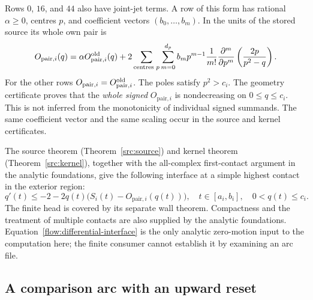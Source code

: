 \documentclass[11pt,a4paper]{article}
\theoremstyle{definition}
\theoremstyle{remark}
\begin{document}
Rows $0$, $16$, and $44$ also have joint-jet terms.  A row of this form
has rational $\alpha\geq0$, centres $p$, and coefficient vectors
$(b_0,\ldots,b_m)$.  In the units of the stored source its whole own pair is
\begin{equation}
 O_{\mathrm{pair},i}(q)=\alpha O_{\mathrm{pair},i}^{\rm old}(q)+
 2\sum_{\text{centres }p}\sum_{m=0}^{d_p}
 b_m p^{m-1}\frac{1}{m!}
 \frac{\partial^m}{\partial p^m}\left(\frac{2p}{p^2-q}\right).
 \label{flow:jet-own}
\end{equation}
For the other rows $O_{\mathrm{pair},i}=O_{\mathrm{pair},i}^{\rm old}$.  The poles satisfy $p^2>c_i$.
The geometry certificate proves that the \emph{whole signed} $O_{\mathrm{pair},i}$ is
nondecreasing on $0\leq q\leq c_i$.  This is not inferred from the
monotonicity of individual signed summands.  The same coefficient vector
and the same scaling occur in the source and kernel certificates.

The source theorem (Theorem~\ref{src:source}) and kernel theorem
(Theorem~\ref{src:kernel}), together
with the all-complex first-contact argument in the analytic foundations,
give the following interface at a simple highest contact in the exterior
region:
\begin{equation}
 q'(t)\leq-2-2q(t)\bigl(S_i(t)-O_{\mathrm{pair},i}(q(t))\bigr),
 \quad t\in[a_i,b_i],\quad 0<q(t)\leq c_i.
 \label{flow:differential-interface}
\end{equation}
The finite head is covered by its separate wall theorem.  Compactness
and the treatment of multiple contacts are also supplied by the analytic
foundations.  Equation~\eqref{flow:differential-interface} is the only
analytic zero-motion input to the computation here; the finite consumer
cannot establish it by examining an arc file.

\subsection{A comparison arc with an upward reset}
\label{flow:arc}
\end{document}
